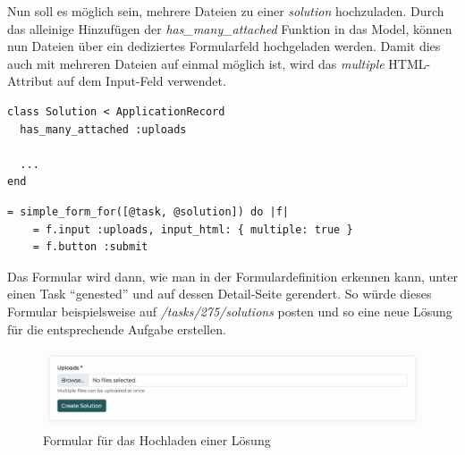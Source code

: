 Nun soll es möglich sein, mehrere Dateien zu einer \emph{solution} hochzuladen. Durch das alleinige Hinzufügen der \emph{has\_many\_attached} Funktion in das Model,
können nun Dateien über ein dediziertes Formularfeld hochgeladen werden. Damit dies auch mit mehreren Dateien auf einmal möglich ist,
wird das \emph{multiple} HTML-Attribut auf dem Input-Feld verwendet. 

\begin{codebox}
\begin{verbatim}
class Solution < ApplicationRecord
  has_many_attached :uploads
  
  ...
end
\end{verbatim}
\end{codebox}

\begin{codebox}
\begin{verbatim}
= simple_form_for([@task, @solution]) do |f|
    = f.input :uploads, input_html: { multiple: true }
    = f.button :submit
\end{verbatim}
\end{codebox}

Das Formular wird dann, wie man in der Formulardefinition erkennen kann, unter einen Task \enquote{genested} und auf dessen Detail-Seite gerendert.
So würde dieses Formular beispielsweise auf \emph{/tasks/275/solutions} posten und so eine neue Lösung für die entsprechende Aufgabe erstellen.

\begin{figure}[H]
  \centering
  \includegraphics[width=\textwidth]{images/upload.png}
  \caption{\label{fig:solution-create}Formular für das Hochladen einer Lösung}
\end{figure}
